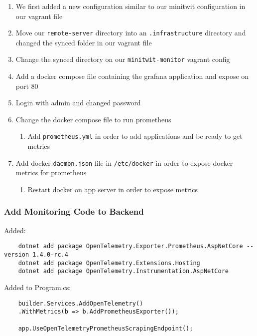 \begin{enumerate}
    \item We first added a new configuration similar to our minitwit configuration in our vagrant file
    \item Move our \texttt{remote-server} directory into an \texttt{.infrastructure} directory and changed the synced folder in our vagrant file
    \item Change the synced directory on our \texttt{minitwit-monitor} vagrant config
    \item Add a docker compose file containing the grafana application and expose on port 80
    \item Login with admin and changed password
    \item Change the docker compose file to run prometheus
    \begin{enumerate}
        \item Add \texttt{prometheus.yml} in order to add applications and be ready to get metrics
    \end{enumerate}

    \item Add docker \texttt{daemon.json} file in \texttt{/etc/docker} in order to expose docker metrics for prometheus

    \begin{enumerate}
        \item Restart docker on app server in order to expose metrics
    \end{enumerate}
\end{enumerate}

\subsubsection{Add Monitoring Code to Backend}
\label{log:add-monitoring-code-to-backend}

Added:

\begin{verbatim}
    dotnet add package OpenTelemetry.Exporter.Prometheus.AspNetCore --version 1.4.0-rc.4
    dotnet add package OpenTelemetry.Extensions.Hosting
    dotnet add package OpenTelemetry.Instrumentation.AspNetCore
\end{verbatim}

Added to Program.cs:

\begin{verbatim}
    builder.Services.AddOpenTelemetry()
    .WithMetrics(b => b.AddPrometheusExporter());

    app.UseOpenTelemetryPrometheusScrapingEndpoint();
\end{verbatim}

